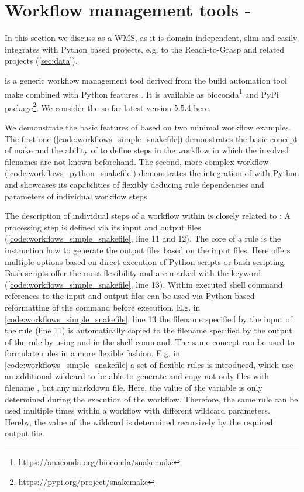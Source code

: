 \section{Workflow management tools - }
\label{sec:snakemake}
In this section we discuss  as a WMS, as it is domain independent, slim and easily integrates with Python based projects, e.g. to the Reach-to-Grasp and related projects (\cref{sec:data}).

 is a generic workflow management tool derived from the build automation tool make combined with Python features \citep{Koster_2012}. It is available as bioconda\footnote{\url{https://anaconda.org/bioconda/snakemake}} and PyPi package\footnote{\url{https://pypi.org/project/snakemake}}. We consider the so far latest version $5.5.4$ here.

We demonstrate the basic features of  based on two minimal workflow examples. The first one (\cref{code:workflows_simple_snakefile}) demonstrates the basic concept of make and the ability of  to define steps in the workflow in which the involved filenames are not known beforehand. The second, more complex workflow (\cref{code:workflows_python_snakefile}) demonstrates the integration of  with Python and showcases its capabilities of flexibly deducing rule dependencies and parameters of individual workflow steps.

The description of individual steps of a workflow within  is closely related to : A processing step is defined via its input and output files (\cref{code:workflows_simple_snakefile}, line 11 and 12). The core of a rule is the instruction how to generate the output files based on the input files. Here  offers multiple options based on direct execution of Python scripts or bash scripting. Bash scripts offer the most flexibility and are marked with the  keyword (\cref{code:workflows_simple_snakefile}, line 13). Within executed shell command references to the input and output files can be used via Python based reformatting of the command before execution. E.g. in \cref{code:workflows_simple_snakefile}, line 13 the filename specified by the input of the rule  (line 11) is automatically copied to the filename specified by the output of the rule by using  and  in the shell command. The same concept can be used to formulate  rules in a more flexible fashion. E.g. in \cref{code:workflows_simple_snakefile} a set of flexible rules is introduced, which use an additional wildcard  to be able to generate and copy not only files with filename , but any markdown file. Here, the value of the variable  is only determined during the execution of the workflow. Therefore, the same rule can be used multiple times within a workflow with different wildcard parameters. Hereby, the value of the wildcard is determined recursively by the required output file.

